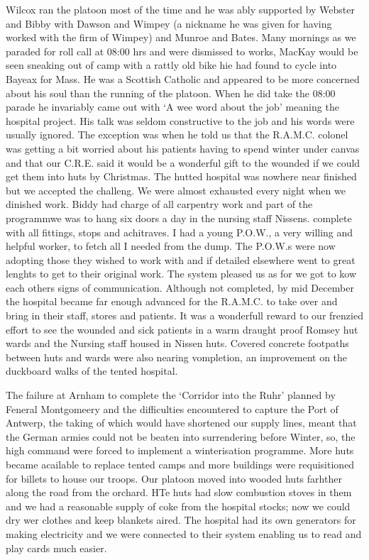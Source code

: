 \Sergeant Wilcox ran the platoon most of the time and he was ably
supported by \lsergeants Webster and Bibby with \corporals Dawson and
Wimpey (a nickname he was given for having worked with the firm of
Wimpey) and \lcorporals Munroe and Bates. Many mornings as we paraded for
roll call at 08:00 hrs and were dismissed to works, \lieutenant MacKay would be
seen sneaking out of camp with a rattly old bike hie had found to
cycle into Bayeax for Mass. He was a Scottish Catholic and appeared to
be more concerned about his soul than the running of the platoon. When
he did take the 08:00 parade he invariably came out with `A wee word
about the job' meaning the hospital project. His talk was seldom
constructive to the job and his words were usually ignored. The
exception was when he told us that the R.A.M.C. colonel was getting a
bit worried about his patients having to spend winter under canvas and
that our C.R.E. said it would be a wonderful gift to the wounded if we
could get them into huts by Christmas. The hutted hospital was nowhere
near finished but we accepted the challeng. We were almost exhausted
every night when we dinished work. \Lsergeant Biddy had charge of all
carpentry work and part of the programmwe was to hang six doors a day
in the nursing staff Nissens. complete with all fittings, stops and
achitraves. I had a young P.O.W., a very willing and helpful worker,
to fetch all I needed from the dump. The P.O.W.s were now adopting
those they wished to work with and if detailed elsewhere went to great
lenghts to get to their original work. The system pleased us as for we
got to kow each others signs of communication. Although not completed,
by mid December the hospital became far enough advanced for the
R.A.M.C. to take over and bring in their staff, stores and
patients. It was a wonderfull reward to our frenzied effort to see the
wounded and sick patients in a warm draught proof Romsey hut wards and
the Nursing staff housed in Nissen huts. Covered concrete footpaths
between huts and wards were also nearing vompletion, an improvement on
the duckboard walks of the tented hospital.

The failure at Arnham to complete the `Corridor into the Ruhr' planned
by Feneral Montgomeery and the difficulties encountered to capture the
Port of Antwerp, the taking of which would have shortened our supply
lines, meant that the German armies could not be beaten into
surrendering before Winter, so, the high command were forced to
implement a winterisation programme. More huts became acailable to
replace tented camps and more buildings were requisitioned for billets
to house our troops. Our platoon moved into wooded huts farhther along
the road from the orchard. HTe huts had slow combustion stoves in them
and we had a reasonable supply of coke from the hospital stocks; now
we could dry wer clothes and keep blankets aired. The hospital had its
own generators for making electricity and we were connected to their
system enabling us to read and play cards much easier.

